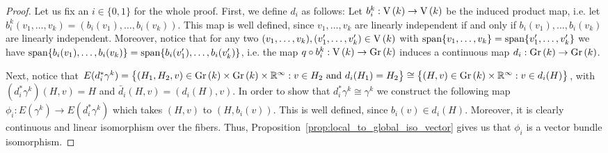 \begin{proof} Let us fix an $i\in\{0,1\}$ for the whole proof. First, we define $d_i$ as follows: Let $b_i^k:\St{k}\to\St{k}$ be the induced product map, i.e. let $b_i^k(v_1,\ldots,v_k)=(b_i(v_1),\ldots,b_i(v_k))$. This map is well defined, since $v_1,\ldots,v_k$ are linearly independent if and only if $b_i(v_1),\ldots,b_i(v_k)$ are linearly independent. Moreover, notice that for any two $(v_1,\ldots,v_k),(v_1',\ldots,v_k')\in\St{k}$ with $\mathrm{span}\{v_1,\ldots,v_k\}=\mathrm{span}\{v_1',\ldots,v_k'\}$ we have $\mathrm{span}\{b_i(v_1),\ldots,b_i(v_k)\}=\mathrm{span}\{b_i(v_1'),\ldots,b_i(v_k')\}$, i.e. the map $q\circ b_i^k:\St{k}\to\Gr{k}$ induces a continuous map $d_i:\Gr{k}\to\Gr{k}$.

Next, notice that $E(d_i^*\gamma^k)=\big\{(H_1,H_2,v)\in\Gr{k}\times\Gr{k}\times\mathbb{R}^{\infty}:v\in H_2\text{ and }d_i(H_1)=H_2\big\}\cong\big\{(H,v)\in\Gr{k}\times\mathbb{R}^{\infty}:v\in d_i(H)\big\}$, with $(d_i^*\gamma^k)(H,v)=H$ and $\bar{d}_i(H,v)=(d_i(H),v)$. In order to show that $d_i^*\gamma^k\cong\gamma^k$ we construct the following map $\phi_i:E(\gamma^k)\to E(d_i^*\gamma^k)$ which takes $(H,v)$ to $(H,b_i(v))$. This is well defined, since $b_i(v)\in d_i(H)$. Moreover, it is clearly continuous and linear isomorphism over the fibers. Thus, Proposition~\ref{prop:local_to_global_iso_vector} gives us that $\phi_i$ is a vector bundle isomorphism.


\end{proof}
